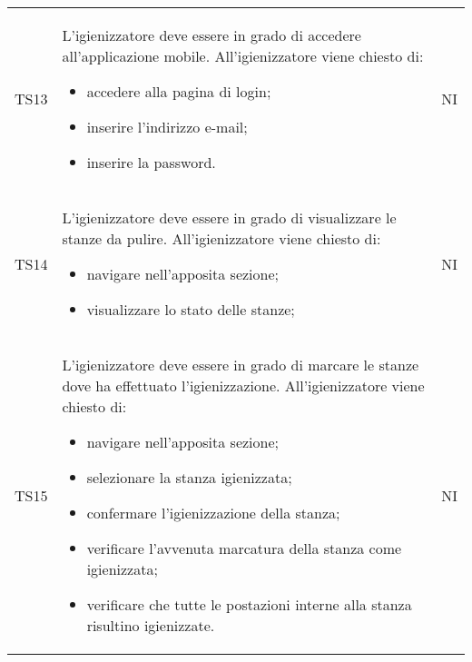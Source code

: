 {\begin{longtable}{ c C{11cm} c }
        TS13&
        \begin{flushleft}
            L'igienizzatore deve essere in grado di accedere all'applicazione mobile.
            All'igienizzatore viene chiesto di:
        \end{flushleft}
        \begin{itemize}
            \item accedere alla pagina di login;
            \item inserire l'indirizzo e-mail;
            \item inserire la password.
        \end{itemize}&
        NI\\

        TS14&
        \begin{flushleft}
            L'igienizzatore deve essere in grado di visualizzare le stanze da pulire.
            All'igienizzatore viene chiesto di:
        \end{flushleft}
        \begin{itemize}
            \item navigare nell'apposita sezione;
            \item visualizzare lo stato delle stanze;
        \end{itemize}&
        NI\\

        TS15&
        \begin{flushleft}
            L'igienizzatore deve essere in grado di marcare le stanze dove ha effettuato l'igienizzazione.
            All'igienizzatore viene chiesto di:
        \end{flushleft}
        \begin{itemize}
            \item navigare nell'apposita sezione;
            \item selezionare la stanza igienizzata;
            \item confermare l'igienizzazione della stanza;
            \item verificare l'avvenuta marcatura della stanza come igienizzata;
            \item verificare che tutte le postazioni interne alla stanza risultino igienizzate.
        \end{itemize}&
        NI\\


\end{longtable}}

